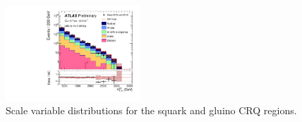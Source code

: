 \begin{figure}[tbp]
\begin{center}
\includegraphics[width=0.45\textwidth]{figures/ATLAS-CONF-2016-078_INT/N-1Plots/AtlasStyle/Preliminary/CRQ_SRJigsawSRS3a_LastCut_CRQ_minusone}
\end{center}
\caption{Scale variable distributions for the squark and gluino CRQ regions.}
\label{fig:CRQ_SRJigsawSRG1a_LastCut_CRQ_minusone}
\end{figure}
